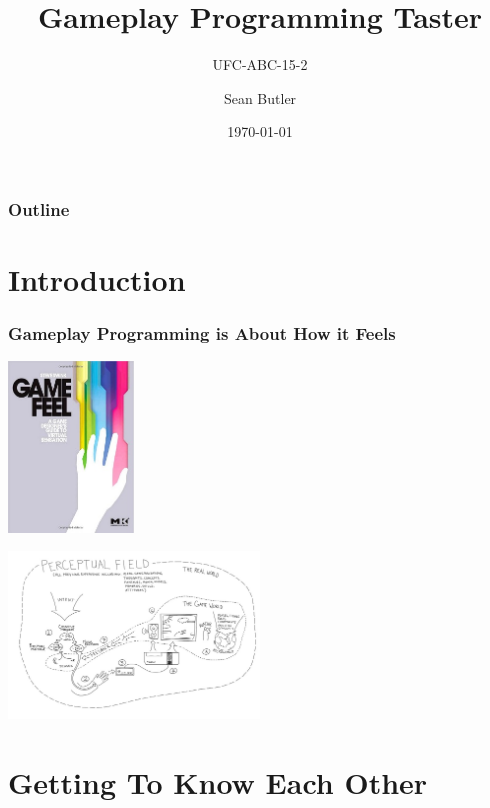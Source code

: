 \documentclass{beamer}
\title{Gameplay Programming Taster}
\subtitle{UFC-ABC-15-2}
\author{Sean Butler}
\institute{UFC-ABC-15-2/ GT B.Sc. / CSCT / UWE}
\date{\today}
\begin{document}
\begin{frame}
    \titlepage
\end{frame}

\begin{frame}
    \frametitle{Outline}
    \tableofcontents
\end{frame}

\section{Introduction}

\begin{frame}
    \frametitle{Gameplay Programming is About How it Feels}
    \begin{multicols}{2}
        \begin{center}
            \includegraphics[width=0.25\textwidth]{./gamefeel.jpg}
        \end{center}
        \columnbreak
        \begin{center}
            \includegraphics[width=0.5\textwidth]{./GameFeelModel.jpg}    
        \end{center}
    \end{multicols}
\end{frame}

\section{Getting To Know Each Other}
\end{document}

